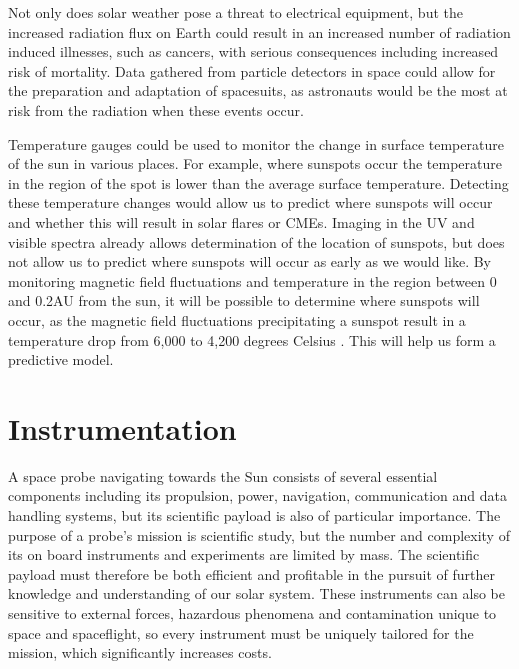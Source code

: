 \documentclass[12pt]{article}
\begin{document}
 Not only does solar weather pose a threat to electrical equipment, but the increased radiation flux on Earth could result in an increased number of radiation induced illnesses, such as cancers, with serious consequences including increased risk of mortality. Data gathered from particle detectors in space could allow for the preparation and adaptation of spacesuits, as astronauts would be the most at risk from the radiation when these events occur. 

\vspace{\baselineskip}

Temperature gauges could be used to monitor the change in surface temperature of the sun in various places. For example, where sunspots occur the temperature in the region of the spot is lower than the average surface temperature. Detecting these temperature changes would allow us to predict where sunspots will occur and whether this will result in solar flares or CMEs. Imaging in the UV and visible spectra already allows determination of the location of sunspots, but does not allow us to predict where sunspots will occur as early as we would like. By monitoring magnetic field fluctuations and temperature in the region between 0 and 0.2AU from the sun, it will be possible to determine where sunspots will occur, as the magnetic field fluctuations precipitating a sunspot result in a temperature drop from 6,000 to 4,200 degrees Celsius \cite{sundata}. This will help us form a predictive model.

\section{Instrumentation} \label{Instrumentation}

A space probe navigating towards the Sun consists of several essential components including its propulsion, power, navigation, communication and data handling systems, but its scientific payload is also of particular importance. The purpose of a probe’s mission is scientific study, but the number and complexity of its on board instruments and experiments are limited by mass. The scientific payload must therefore be both efficient and profitable in the pursuit of further knowledge and understanding of our solar system. These instruments can also be sensitive to external forces, hazardous phenomena and contamination unique to space and spaceflight, so every instrument must be uniquely tailored for the mission, which significantly increases costs.

\vspace{\baselineskip}
\end{document}
